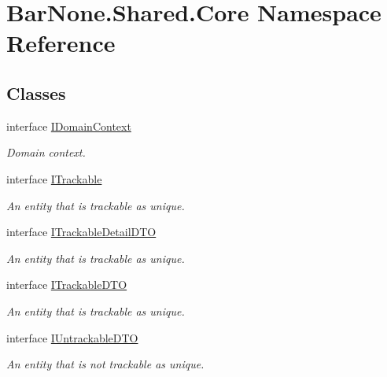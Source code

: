 \hypertarget{namespace_bar_none_1_1_shared_1_1_core}{}\section{Bar\+None.\+Shared.\+Core Namespace Reference}
\label{namespace_bar_none_1_1_shared_1_1_core}
\subsection*{Classes}
\begin{DoxyCompactItemize}
\item 
interface \mbox{\hyperlink{interface_bar_none_1_1_shared_1_1_core_1_1_i_domain_context}{I\+Domain\+Context}}
\begin{DoxyCompactList}\small\item\em Domain context. \end{DoxyCompactList}\item 
interface \mbox{\hyperlink{interface_bar_none_1_1_shared_1_1_core_1_1_i_trackable}{I\+Trackable}}
\begin{DoxyCompactList}\small\item\em An entity that is trackable as unique. \end{DoxyCompactList}\item 
interface \mbox{\hyperlink{interface_bar_none_1_1_shared_1_1_core_1_1_i_trackable_detail_d_t_o}{I\+Trackable\+Detail\+D\+TO}}
\begin{DoxyCompactList}\small\item\em An entity that is trackable as unique. \end{DoxyCompactList}\item 
interface \mbox{\hyperlink{interface_bar_none_1_1_shared_1_1_core_1_1_i_trackable_d_t_o}{I\+Trackable\+D\+TO}}
\begin{DoxyCompactList}\small\item\em An entity that is trackable as unique. \end{DoxyCompactList}\item 
interface \mbox{\hyperlink{interface_bar_none_1_1_shared_1_1_core_1_1_i_untrackable_d_t_o}{I\+Untrackable\+D\+TO}}
\begin{DoxyCompactList}\small\item\em An entity that is not trackable as unique. \end{DoxyCompactList}\end{DoxyCompactItemize}
